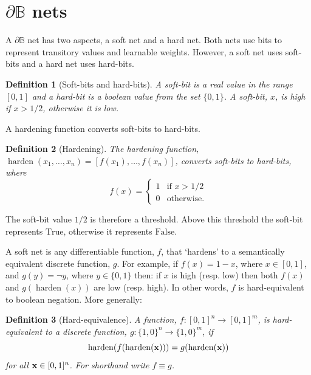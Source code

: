 \documentclass{article} %
\newtheorem*{definition}{Definition}
\begin{document}
\section{$\partial\mathbb{B}$ nets}

A $\partial \mathbb{B}$ net has two aspects, a soft net and a hard net. Both nets use bits to represent transitory values and learnable weights. However, a soft net uses soft-bits and a hard net uses hard-bits.

\begin{definition}[Soft-bits and hard-bits]
A {\em soft-bit} is a real value in the range $[0,1]$ and a {\em hard-bit} is a boolean value from the set $\{0,1\}$. A soft-bit, $x$, is {\em high} if $x>1/2$, otherwise it is {\em low}.
\end{definition}

A hardening function converts soft-bits to hard-bits.

\begin{definition}[Hardening]
The {\em hardening} function, $\operatorname{harden}(x_{1}, \dots, x_{n}) = [f(x_{1}), \dots, f(x_{n})]$, converts soft-bits to hard-bits, where
\begin{equation*}
f(x) =
\begin{cases}
1 & \text{if } x > 1/2 \\
0 & \text{otherwise.}
\end{cases}
\end{equation*}
\end{definition}

The soft-bit value $1/2$ is therefore a threshold. Above this threshold the soft-bit represents $\text{True}$, otherwise it represents $\text{False}$.

A soft net is any differentiable function, $f$, that `hardens' to a semantically equivalent discrete function, $g$. For example, if $f(x) = 1 - x$, where $x \in [0,1]$, and $g(y) = \neg y$, where $y \in \{0,1\}$ then: if $x$ is high (resp. low) then both $f(x)$ and $g(\operatorname{harden}(x))$ are low (resp. high). In other words, $f$ is hard-equivalent to boolean negation. More generally:

\begin{definition}[Hard-equivalence]
	A function, $f: [0,1]^n \rightarrow [0,1]^m$, is {\em hard-equivalent} to a discrete function, $g: \{1,0\}^n \rightarrow \{1,0\}^m$,	if
	\begin{equation*}
	\operatorname{harden}(f(\operatorname{harden}({\bf x}))) = g(\operatorname{harden}({\bf x}))
	\end{equation*}
for all ${\bf x} \in [0,1]^{n}$. For shorthand write $f \equiv g$.
\end{definition}
\end{document}
